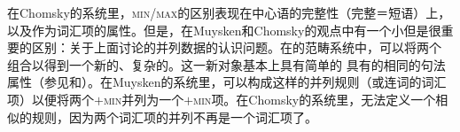 在Chomsky的系统里，\textsc{min}/\textsc{max}的区别表现在中心语的完整性（完整＝短语）上，以及作为词汇项的属性。但是，在Muysken和Chomsky的观点中有一个小但是很重要的区别：关于上面讨论的并列数据的认识问题。在\xbartc 的范畴系统中，可以将两个\xzeroc{} 组合以得到一个新的、复杂的\xzeroc。这一新对象基本上具有简单的\xzeroc{} 具有的相同的句法属性（参见\citealp[]{Jackendoff77a}和\citealp*{GKPS85a}）。在Muysken的系统里，可以构成这样的并列规则（或连词的词汇项）以便将两个$+$\textsc{min}并列为一个$+$\textsc{min}项。在Chomsky的系统里，无法定义一个相似的规则，因为两个词汇项的并列不再是一个词汇项了。

